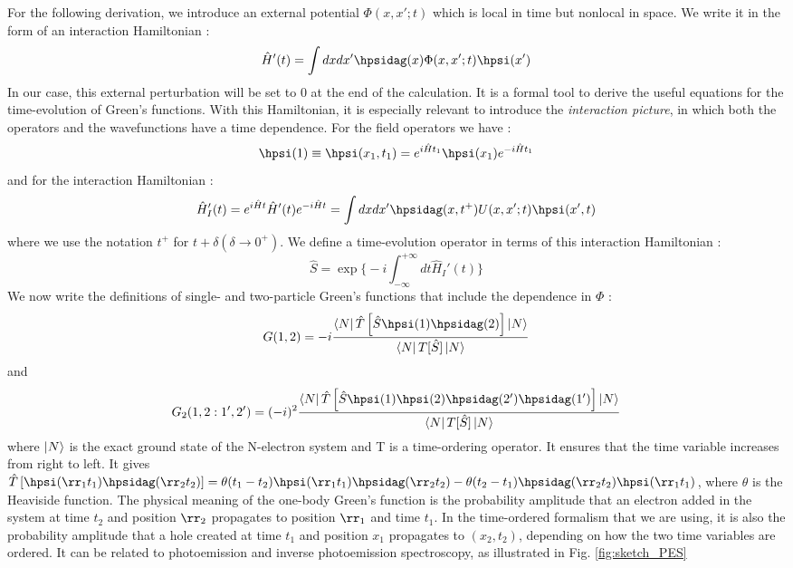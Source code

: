 For the following derivation, we introduce an external potential $\Phi(x,x';t)$ which is local in time but nonlocal in space. We write it in the form of an interaction Hamiltonian :
\begin{equation}
	\hat{H}'(t) = \int dx dx' \hpsidag(x) \Phi(x,x';t) \hpsi(x') 
\end{equation}
In our case, this external perturbation will be set to 0 at the end of the calculation. It is a formal tool to derive the useful equations for the time-evolution of Green's functions. With this Hamiltonian, it is especially relevant to introduce the \textit{interaction picture}, in which both the operators and the wavefunctions have a time dependence.\cite{martin2016interacting} For the field operators we have :
\begin{equation}
	\hpsi(1) \equiv \hpsi(x_1, t_1) = e^{i\hat{H} t_1} \hpsi(x_1) e^{-i\hat{H} t_1}
\end{equation}
and for the interaction Hamiltonian :
\begin{equation}
	\hat{H}_I'(t) = e^{i\hat{H} t} \hat{H}'(t) e^{-i\hat{H} t} = \int dx dx' \hpsidag(x,t^+) U(x,x';t) \hpsi(x',t)
\end{equation}
where we use the notation $t^+$ for $t+\delta (\delta \to 0^+)$. We define a time-evolution operator in terms of this interaction Hamiltonian :
\begin{equation}
	\hat{S} = \exp\biggl\{ -i \int_{-\infty}^{+\infty} dt \hat{H}_I'(t) \biggr\}
\end{equation}
We now write the definitions of single- and two-particle Green's functions that include the dependence in $\Phi$ :
\begin{equation}
	G(1,2) = -i \frac{\bra{N}\hat{T}\left[\hat{S}\hpsi(1)\hpsidag(2)\right]\ket{N}}{\bra{N}T[\hat{S}]\ket{N}} \label{eq:GF}
\end{equation}
and
\begin{equation}
	G_2(1,2:1',2') = (-i)^2  \frac{\bra{N}\hat{T}\left[\hat{S}\hpsi(1)\hpsi(2)\hpsidag(2')\hpsidag(1')\right]\ket{N}}{\bra{N}T[\hat{S}]\ket{N}}\label{eq:2GF}
\end{equation}
where $\ket{N}$ is the exact ground state of the N-electron system and T is a time-ordering operator. It ensures that the time variable increases from right to left. It gives $\hat{T}\left[ \hpsi(\rr_1 t_1) \hpsidag(\rr_2 t_2) \right] = \theta(t_1 - t_2) \hpsi(\rr_1 t_1) \hpsidag(\rr_2 t_2) - \theta(t_2-t_1)\hpsidag(\rr_2 t_2)\hpsi(\rr_1 t_1)$, where $\theta$ is the Heaviside function.\cite{fetter2012quantum} The physical meaning of the one-body Green's function is the probability amplitude that an electron added in the system at time $t_2$ and position $\rr_2$ propagates to position $\rr_1$ and time $t_1$. In the time-ordered formalism that we are using, it is also the probability amplitude that a hole created at time $t_1$ and position $x_1$ propagates to $(x_2,t_2)$, depending on how the two time variables are ordered. It can be related to photoemission and inverse photoemission spectroscopy, as illustrated in Fig. \ref{fig:sketch_PES}
